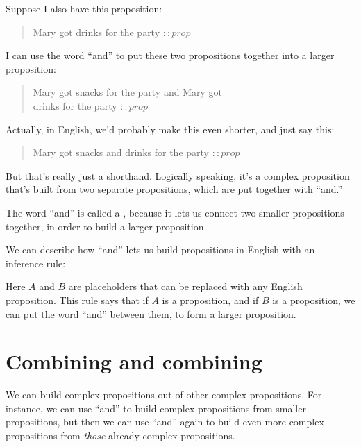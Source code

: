\documentclass[../../../main.tex]{subfiles}
\begin{document}
\noindent
Suppose I also have this proposition: 

\begin{quote}
  Mary got drinks for the party $:: prop$
\end{quote}

\noindent
I can use the word ``and'' to put these two propositions together into a larger proposition:

\begin{quote}
  Mary got snacks for the party and Mary got \\ drinks for the party $:: prop$
\end{quote}

\noindent
Actually, in English, we'd probably make this even shorter, and just say this:

\begin{quote}
  Mary got snacks and drinks for the party $:: prop$
\end{quote}

\noindent
But that's really just a shorthand. Logically speaking, it's a complex proposition that's built from two separate propositions, which are put together with ``and.''

The word ``and'' is called a , because it lets us connect two smaller propositions together, in order to build a larger proposition.

We can describe how ``and'' lets us build propositions in English with an inference rule:

\begin{prooftree*}
\end{prooftree*}

\noindent
Here $A$ and $B$ are placeholders that can be replaced with any English proposition. This rule says that if $A$ is a proposition, and if $B$ is a proposition, we can put the word ``and'' between them, to form a larger proposition.


\section{Combining and combining}

We can build complex propositions out of other complex propositions. For instance, we can use ``and'' to build complex propositions from smaller propositions, but then we can use ``and'' again to build even more complex propositions from \emph{those} already complex propositions.
\end{document}
